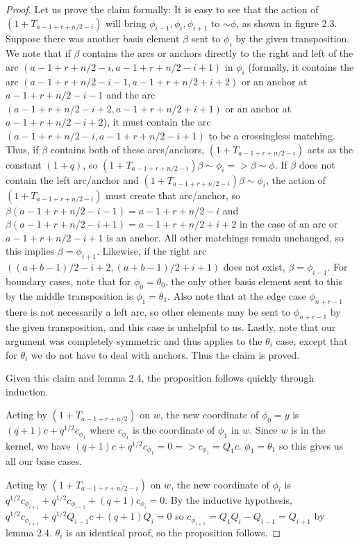 \documentclass{amsart}
\begin{document}
\begin{proof}
	Let us prove the claim formally: It is easy to see that the action of $(1+T_{a-1+r+n/2-i})$ will bring $\phi_{i-1},\phi_i,\phi_{i+1}$ to $\sim \phi$, as shown in figure 2.3. Suppose there was another basis element $\beta$ sent to $\phi_i$ by the given transposition. We note that if $\beta$ contains the arcs or anchors directly to the right and left of the arc $(a-1+r+n/2-i,a-1+r+n/2-i+1)$ in $\phi_i$ (formally, it contains the arc $(a-1+r+n/2-i-1,a-1+r+n/2+i+2)$ or an anchor at $a-1+r+n/2-i-1$ and the arc $(a-1+r+n/2-i+2,a-1+r+n/2+i+1)$ or an anchor at $a-1+r+n/2-i+2$), it must contain the arc $(a-1+r+n/2-i,a-1+r+n/2-i+1)$ to be a crossingless matching. Thus, if $\beta$ contains both of these arcs/anchors, $(1+T_{a-1+r+n/2-i})$ acts as the constant $(1+q)$, so $(1+T_{a-1+r+n/2-i})\beta\sim \phi_i=>\beta\sim \phi$. If $\beta$ does not contain the left arc/anchor and $(1+T_{a-1+r+n/2-i})\beta\sim \phi_i$, the action of $(1+T_{a-1+r+n/2-i})$ must create that arc/anchor, so $\beta(a-1+r+n/2-i-1)=a-1+r+n/2-i$ and $\beta(a-1+r+n/2-i+1)=a-1+r+n/2+i+2$ in the case of an arc or $a-1+r+n/2-i+1$ is an anchor. All other matchings remain unchanged, so this implies $\beta=\phi_{i+1}$. Likewise, if the right arc $((a+b-1)/2-i+2,(a+b-1)/2+i+1)$ does not exist, $\beta=\phi_{i-1}$. For boundary cases, note that for $\phi_0=\theta_0$, the only other basis element sent to this by the middle transposition is $\phi_1=\theta_1$. Also note that at the edge case $\phi_{n+r-1}$ there is not necessarily a left arc, so other elements may be sent to $\phi_{n+r-1}$ by the given transposition, and this case is unhelpful to us. Lastly, note that our argument was completely symmetric and thus applies to the $\theta_i$ case, except that for $\theta_i$ we do not have to deal with anchors. Thus the claim is proved.
	
	Given this claim and lemma 2.4, the proposition follows quickly through induction. 
	
	Acting by $(1+T_{a-1+r+n/2})$ on $w$, the new coordinate of $\phi_0=y$ is $(q+1)c+q^{1/2}c_{\phi_1}$ where $c_{\phi_1}$ is the coordinate of $\phi_1$ in $w$. Since $w$ is in the kernel, we have $(q+1)c+q^{1/2}c_{\phi_1}=0=>c_{\phi_1}=Q_1c$. $\phi_1=\theta_1$ so this gives us all our base cases.
	
	Acting by $(1+T_{a-1+r+n/2-i})$ on $w$, the new coordinate of $\phi_i$ is $q^{1/2}c_{\phi_{i+1}}+q^{1/2}c_{\phi_{i-1}}+(q+1)c_{\phi_{i}}=0$. By the inductive hypothesis, $q^{1/2}c_{\phi_{i+1}}+q^{1/2}Q_{i-1}c+(q+1)Q_i=0$ so $c_{\phi_{i+1}}=Q_1Q_i-Q_{i-1}=Q_{i+1}$ by lemma 2.4. $\theta_i$ is an identical proof, so the proposition follows. 
	

\end{proof}
\end{document}
